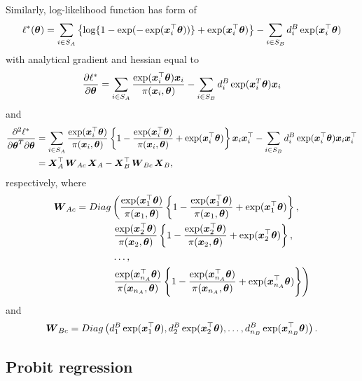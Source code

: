 \documentclass[
  letterpaper,
  DIV=11,
  numbers=noendperiod]{scrreprt}
\begin{document}
Similarly, log-likelihood function has form of \[
\ell^{*}(\boldsymbol{\theta}) = \sum_{i \in S_{A}}\left\{\log\{1 - \exp(-\exp(\boldsymbol{x}_{i}^{\top}\boldsymbol{\theta}))\} + \exp(\boldsymbol{x}_{i}^{\top}\boldsymbol{\theta})\right\} - \sum_{i \in S_{B}} d_{i}^{B}\exp(\boldsymbol{x}_{i}^{\top}\boldsymbol{\theta})
\] with analytical gradient and hessian equal to \[
    \frac{\partial \ell^*}{\partial\boldsymbol{\theta}} = \sum_{i \in S_{A}}\frac{\exp(\boldsymbol{x}_{i}^{\top}\boldsymbol{\theta})\boldsymbol{x}_{i}}{\pi(\boldsymbol{x}_{i}, \boldsymbol{\theta})} - \sum_{i \in S_{B}}d_{i}^{B}\exp(\boldsymbol{x}_{i}^{T}\boldsymbol{\theta})\boldsymbol{x}_{i}
\] and \[
    \begin{split}
    \frac{\partial^{2} \ell^{*}}{\partial\boldsymbol{\theta}^{T} \partial\boldsymbol{\theta}} & = \sum_{i \in S_A} \frac{\exp(\boldsymbol{x}_{i}^{\top}\boldsymbol{\theta})}{\pi(\boldsymbol{x}_{i}, \boldsymbol{\theta})} \left\{1 - \frac{\exp(\boldsymbol{x}_{i}^{\top}\boldsymbol{\theta})}{\pi(\boldsymbol{x}_{i}, \boldsymbol{\theta})} + \exp(\boldsymbol{x}_{i}^{\top}\boldsymbol{\theta})\right\}\boldsymbol{x}_i\boldsymbol{x}_i^{\top} - \sum_{i \in S_B}d_i^B\exp (\boldsymbol{x}_{i}^{\top}\boldsymbol{\theta})\boldsymbol{x}_i\boldsymbol{x}_i^{\top} \\ & = \boldsymbol{X}_A^{\top}\operatorname{\boldsymbol{W}}_{Ac}\boldsymbol{X}_A - \boldsymbol{X}_B^{\top}\operatorname{\boldsymbol{W}}_{Bc}\boldsymbol{X}_B,
    \end{split}
\] respectively, where \[
\begin{align*}
    \operatorname{\boldsymbol{W}}_{Ac} =  Diag & \left(\frac{\exp(\boldsymbol{x}_{1}^{\top}\boldsymbol{\theta})}{\pi(\boldsymbol{x}_{1}, \boldsymbol{\theta})} \left\{1 - \frac{\exp(\boldsymbol{x}_{1}^{\top}\boldsymbol{\theta})}{\pi(\boldsymbol{x}_{1}, \boldsymbol{\theta})} + \exp(\boldsymbol{x}_{1}^{\top}\boldsymbol{\theta})\right\}, \right.
    \\
    & \left. \frac{\exp(\boldsymbol{x}_{2}^{\top}\boldsymbol{\theta})}{\pi(\boldsymbol{x}_{2}, \boldsymbol{\theta})} \left\{1 - \frac{\exp(\boldsymbol{x}_{2}^{\top}\boldsymbol{\theta})}{\pi(\boldsymbol{x}_{2}, \boldsymbol{\theta})} + \exp(\boldsymbol{x}_{2}^{\top}\boldsymbol{\theta})\right\}, \right.
    \\
    & \left. \ldots, \right.
    \\ 
    & \left. \frac{\exp(\boldsymbol{x}_{n_A}^{\top}\boldsymbol{\theta})} {\pi(\boldsymbol{x}_{n_A}, \boldsymbol{\theta})} \left\{1 - \frac{\exp(\boldsymbol{x}_{n_A}^{\top}\boldsymbol{\theta})}{\pi(\boldsymbol{x}_{n_A}, \boldsymbol{\theta})} + \exp(\boldsymbol{x}_{n_A}^{\top}\boldsymbol{\theta})\right\} \right)
\end{align*}
\] and \[
\begin{align*}
    \operatorname{\boldsymbol{W}}_{Bc} = Diag \left(d_1^B\exp (\boldsymbol{x}_{1}^{\top}\boldsymbol{\theta}), d_2^B\exp (\boldsymbol{x}_{2}^{\top}\boldsymbol{\theta}), \ldots, d_{n_B}^B\exp (\boldsymbol{x}_{n_{B}}^{\top}\boldsymbol{\theta})\right).
\end{align*}
\]

\subsection{Probit regression}\label{probit-regression}
\end{document}
